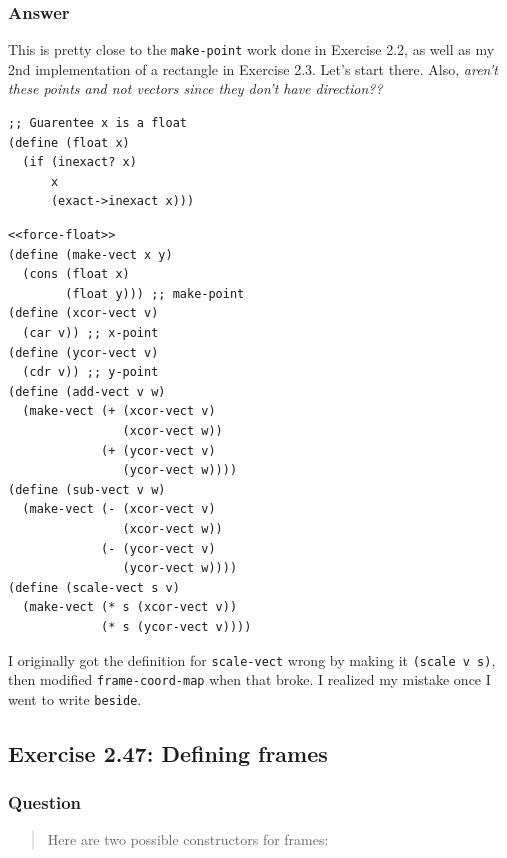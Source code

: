 \documentclass[final,fleqn,titlepage,twoside]{article}
\begin{document}
\subsubsection{Answer}
\label{sec:org9a5bfa7}
This is pretty close to the \texttt{make-point} work done in Exercise 2.2, as well as my 2nd implementation of a rectangle in Exercise 2.3. Let's start there. Also, \emph{aren't these points and not vectors since they don't have direction??}

\begin{verbatim}
;; Guarentee x is a float
(define (float x)
  (if (inexact? x)
      x
      (exact->inexact x)))
\end{verbatim}

\begin{verbatim}
<<force-float>>
(define (make-vect x y)
  (cons (float x)
        (float y))) ;; make-point
(define (xcor-vect v)
  (car v)) ;; x-point
(define (ycor-vect v)
  (cdr v)) ;; y-point
(define (add-vect v w)
  (make-vect (+ (xcor-vect v)
                (xcor-vect w))
             (+ (ycor-vect v)
                (ycor-vect w))))
(define (sub-vect v w)
  (make-vect (- (xcor-vect v)
                (xcor-vect w))
             (- (ycor-vect v)
                (ycor-vect w))))
(define (scale-vect s v)
  (make-vect (* s (xcor-vect v))
             (* s (ycor-vect v))))
\end{verbatim}

I originally got the definition for \texttt{scale-vect} wrong by making it
\texttt{(scale v s)}, then modified \texttt{frame-coord-map} when that
broke. I realized my mistake once I went to write \texttt{beside}.

\subsection{Exercise 2.47: Defining frames}
\label{sec:orga001085}
\subsubsection{Question}
\label{sec:org58b136f}
\begin{quote}
Here are two possible
constructors for frames:
\end{quote}
\end{document}

